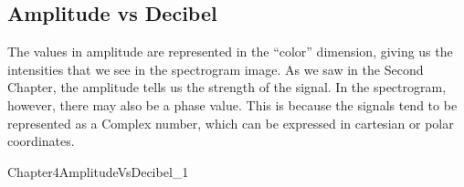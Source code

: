 \documentclass{book}
\begin{document}
\subsection{Amplitude vs Decibel}
\qquad The values in amplitude are represented in the “color” dimension, giving us the intensities that we see in the spectrogram image. As we saw in the Second Chapter, the amplitude tells us the strength of the signal. In the spectrogram, however, there may also be a phase value. This is because the signals tend to be represented as a Complex number, which can be expressed in cartesian or polar coordinates.
\par
Chapter4AmplitudeVsDecibel\_1



\end{document}
